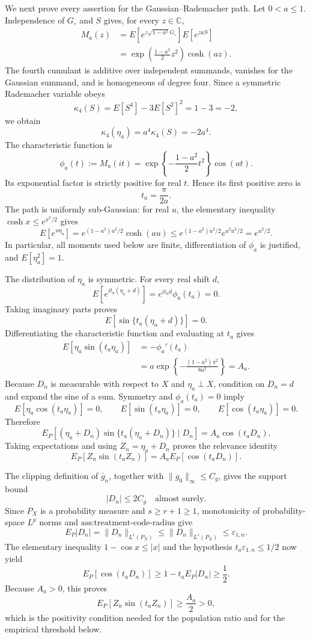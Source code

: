 We next prove every assertion for the Gaussian--Rademacher path.  Let \(0<a\leq1\).  Independence of \(G_\circ\) and \(S\) gives, for every \(z\in\mathbb C\),
\[
\begin{aligned}
 M_a(z)
 &=E[e^{z\sqrt{1-a^2}G_\circ}]E[e^{zaS}]\\
 &=\exp\!\left(\frac{1-a^2}{2}z^2\right)\cosh(az).
\end{aligned}
\]
The fourth cumulant is additive over independent summands, vanishes for the Gaussian summand, and is homogeneous of degree four.  Since a symmetric Rademacher variable obeys
\[
 \kappa_4(S)=E[S^4]-3E[S^2]^2=1-3=-2,
\]
we obtain
\[
 \kappa_4(\eta_a)=a^4\kappa_4(S)=-2a^4.
\]
The characteristic function is
\[
 \phi_a(t):=M_a(it)
 =\exp\!\left\{-\frac{1-a^2}{2}t^2\right\}\cos(at).
\]
Its exponential factor is strictly positive for real \(t\).  Hence its first positive zero is
\[
 t_a=\frac{\pi}{2a}.
\]
The path is uniformly sub-Gaussian: for real \(u\), the elementary inequality \(\cosh x\leq e^{x^2/2}\) gives
\[
 E[e^{u\eta_a}]
 =e^{(1-a^2)u^2/2}\cosh(au)
 \leq e^{(1-a^2)u^2/2}e^{a^2u^2/2}
 =e^{u^2/2}.
\]
In particular, all moments used below are finite, differentiation of \(\phi_a\) is justified, and \(E[\eta_a^2]=1\).

The distribution of \(\eta_a\) is symmetric.  For every real shift \(d\),
\[
 E[e^{it_a(\eta_a+d)}]
 =e^{it_ad}\phi_a(t_a)=0.
\]
Taking imaginary parts proves
\[
 E[\sin\{t_a(\eta_a+d)\}]=0.
\]
Differentiating the characteristic function and evaluating at \(t_a\) gives
\[
\begin{aligned}
 E[\eta_a\sin(t_a\eta_a)]
 &=-\phi_a'(t_a)\\
 &=a\exp\!\left\{-\frac{(1-a^2)\pi^2}{8a^2}\right\}
 =A_a.
\end{aligned}
\]
Because \(D_n\) is measurable with respect to \(X\) and \(\eta_a\perp X\), condition on \(D_n=d\) and expand the sine of a sum.  Symmetry and \(\phi_a(t_a)=0\) imply
\[
 E[\eta_a\cos(t_a\eta_a)]=0,
 \qquad
 E[\sin(t_a\eta_a)]=0,
 \qquad
 E[\cos(t_a\eta_a)]=0.
\]
Therefore
\[
 E_P[(\eta_a+D_n)\sin\{t_a(\eta_a+D_n)\}\mid D_n]
 =A_a\cos(t_aD_n).
\]
Taking expectations and using \(Z_n=\eta_a+D_n\) proves the relevance identity
\[
 E_P[Z_n\sin(t_aZ_n)]
 =A_aE_P[\cos(t_aD_n)].
\]

The clipping definition of \(\bar g_n\), together with \(\lVert g_0\rVert_\infty\leq C_g\), gives the support bound
\[
 \lvert D_n\rvert\leq2C_g
 \quad\text{almost surely}.
\]
Since \(P_X\) is a probability measure and \(s\geq r+1\geq1\), monotonicity of probability-space \(L^p\) norms and \(\text{ass:treatment-code-radius}\) give
\[
 E_P\lvert D_n\rvert
 =\lVert D_n\rVert_{L^1(P_X)}
 \leq\lVert D_n\rVert_{L^s(P_X)}
 \leq\varepsilon_{1,n}.
\]
The elementary inequality \(1-\cos x\leq\lvert x\rvert\) and the hypothesis \(t_a\varepsilon_{1,n}\leq1/2\) now yield
\[
 E_P[\cos(t_aD_n)]
 \geq1-t_aE_P\lvert D_n\rvert
 \geq\frac12.
\]
Because \(A_a>0\), this proves
\[
 E_P[Z_n\sin(t_aZ_n)]\geq\frac{A_a}{2}>0,
\]
which is the positivity condition needed for the population ratio and for the empirical threshold below.

